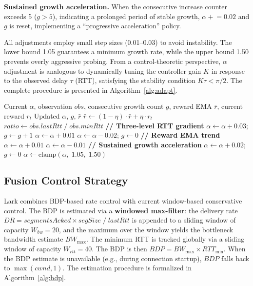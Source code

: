 \documentclass[10pt,twocolumn]{article}
\begin{document}
\textbf{Sustained growth acceleration.} When the consecutive increase counter exceeds 5 ($g > 5$), indicating a prolonged period of stable growth, $\alpha \mathrel{+}= 0.02$ and $g$ is reset, implementing a ``progressive acceleration'' policy.

All adjustments employ small step sizes (0.01--0.03) to avoid instability. The lower bound 1.05 guarantees a minimum growth rate, while the upper bound 1.50 prevents overly aggressive probing. From a control-theoretic perspective, $\alpha$ adjustment is analogous to dynamically tuning the controller gain $K$ in response to the observed delay $\tau$ (RTT), satisfying the stability condition $K\tau < \pi/2$. The complete procedure is presented in Algorithm~\ref{alg:adapt}.

\begin{algorithm}[htbp]
\caption{RL-Driven Adaptive Parameter Tuning}
\label{alg:adapt}
\small
\begin{algorithmic}[1]
\REQUIRE Current $\alpha$, observation $obs$, consecutive growth count $g$, reward EMA $\bar{r}$, current reward $r_t$
\ENSURE Updated $\alpha$, $g$, $\bar{r}$
\STATE $\bar{r} \leftarrow (1 - \eta) \cdot \bar{r} + \eta \cdot r_t$ 
\STATE $ratio \leftarrow obs.lastRtt \;/\; obs.minRtt$
\STATE \textbf{// Three-level RTT gradient}
    \STATE $\alpha \leftarrow \alpha + 0.03$; \quad $g \leftarrow g + 1$
    \STATE $\alpha \leftarrow \alpha + 0.01$
    \STATE $\alpha \leftarrow \alpha - 0.02$; \quad $g \leftarrow 0$
\ENDIF
\STATE \textbf{// Reward EMA trend}
    \STATE $\alpha \leftarrow \alpha + 0.01$
    \STATE $\alpha \leftarrow \alpha - 0.01$
\ENDIF
\STATE \textbf{// Sustained growth acceleration}
    \STATE $\alpha \leftarrow \alpha + 0.02$; \quad $g \leftarrow 0$
\ENDIF
\STATE $\alpha \leftarrow \text{clamp}(\alpha, \; 1.05, \; 1.50)$
\end{algorithmic}
\end{algorithm}

\subsection{Fusion Control Strategy}

Lark combines BDP-based rate control with current window-based conservative control. The BDP is estimated via a \textbf{windowed max-filter}: the delivery rate $DR = segmentsAcked \times segSize \;/\; lastRtt$ is appended to a sliding window of capacity $W_{bw} = 20$, and the maximum over the window yields the bottleneck bandwidth estimate $BW_{\max}$. The minimum RTT is tracked globally via a sliding window of capacity $W_{rtt} = 40$. The BDP is then $BDP = BW_{\max} \times RTT_{\min}$. When the BDP estimate is unavailable (e.g., during connection startup), $BDP$ falls back to $\max(cwnd, 1)$. The estimation procedure is formalized in Algorithm~\ref{alg:bdp}.
\end{document}
